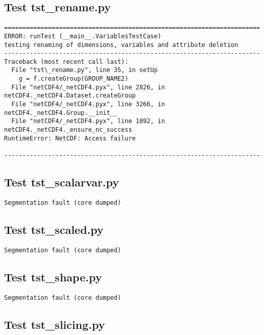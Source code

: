 \subsection{Test tst\_rename.py}

\begin{verbatim}
======================================================================
ERROR: runTest (__main__.VariablesTestCase)
testing renaming of dimensions, variables and attribute deletion
----------------------------------------------------------------------
Traceback (most recent call last):
  File "tst\_rename.py", line 35, in setUp
    g = f.createGroup(GROUP_NAME2)
  File "netCDF4/_netCDF4.pyx", line 2826, in netCDF4._netCDF4.Dataset.createGroup
  File "netCDF4/_netCDF4.pyx", line 3266, in netCDF4._netCDF4.Group.__init__
  File "netCDF4/_netCDF4.pyx", line 1892, in netCDF4._netCDF4._ensure_nc_success
RuntimeError: NetCDF: Access failure

----------------------------------------------------------------------
\end{verbatim}

\subsection{Test tst\_scalarvar.py}

\begin{verbatim}
Segmentation fault (core dumped)
\end{verbatim}

\subsection{Test tst\_scaled.py}

\begin{verbatim}
Segmentation fault (core dumped)
\end{verbatim}

\subsection{Test tst\_shape.py}

\begin{verbatim}
Segmentation fault (core dumped)
\end{verbatim}

\subsection{Test tst\_slicing.py}

